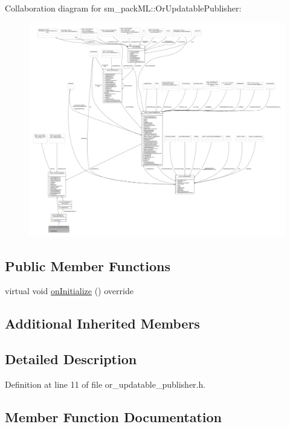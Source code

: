 Collaboration diagram for sm\+\_\+pack\+ML\+:\+:Or\+Updatable\+Publisher\+:
\nopagebreak
\begin{figure}[H]
\begin{center}
\leavevmode
\includegraphics[width=350pt]{classsm__packML_1_1OrUpdatablePublisher__coll__graph}
\end{center}
\end{figure}
\subsection*{Public Member Functions}
\begin{DoxyCompactItemize}
\item 
virtual void \hyperlink{classsm__packML_1_1OrUpdatablePublisher_af96ca3d9ef520a93e0497745ac0270d0}{on\+Initialize} () override
\end{DoxyCompactItemize}
\subsection*{Additional Inherited Members}


\subsection{Detailed Description}


Definition at line 11 of file or\+\_\+updatable\+\_\+publisher.\+h.



\subsection{Member Function Documentation}
